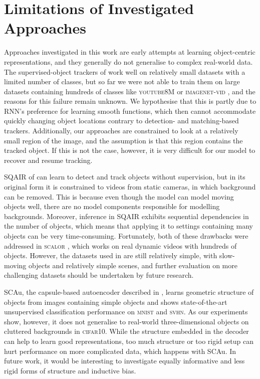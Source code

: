 \section{Limitations of Investigated Approaches}
Approaches investigated in this work are early attempts at learning object-centric representations, and they generally do not generalise to complex real-world data.
The supervised-object trackers of  work well on relatively small datasets with a limited number of classes, but so far we were not able to train them on large datasets containing hundreds of classes like \textsc{youtube8M} \citep{AbuElHaija2016y8m} or \textsc{imagenet-vid} \citep{Russakovsky2014imagenet}, and the reasons for this failure remain unknown.
We hypothesise that this is partly due to \gls{RNN}'s preference for learning smooth functions, which then cannot accommodate quickly changing object locations contrary to detection- and matching-based trackers. 
Additionally, our approaches are constrained to look at a relatively small region of the image, and the assumption is that this region contains the tracked object.
If this is not the case, however, it is very difficult for our model to recover and resume tracking.

\Gls{SQAIR} of  can learn to detect and track objects without supervision, but in its original form it is constrained to videos from static cameras, in which background can be removed. 
This is because even though the model can model moving objects well, there are no model components responsible for modelling backgrounds.
Moreover, inference in \gls{SQAIR} exhibits sequential dependencies in the number of objects, which means that applying it to settings containing many objects can be very time-consuming.
Fortunately, both of these drawbacks were addressed in \textsc{scalor} \citep{Jiang2019scalor}, which works on real dynamic videos with hundreds of objects.
However, the datasets used in \cite{Jiang2019scalor} are still relatively simple, with slow-moving objects and relatively simple scenes, and further evaluation on more challenging datasets should be undertaken by future research.

\Gls{SCAu}, the capsule-based autoencoder described in , learns geometric structure of objects from images containing simple objects and shows state-of-the-art unsupervised classification performance on \textsc{mnist} and \textsc{svhn}.
As our experiments show, however, it does not generalise to real-world three-dimensional objects on cluttered backgrounds in \textsc{cifar10}.
While the structure embedded in the decoder can help to learn good representations, too much structure or too rigid setup can hurt performance on more complicated data, which happens with \gls{SCAu}.
In future work, it would be interesting to investigate equally informative and less rigid forms of structure and inductive bias.

